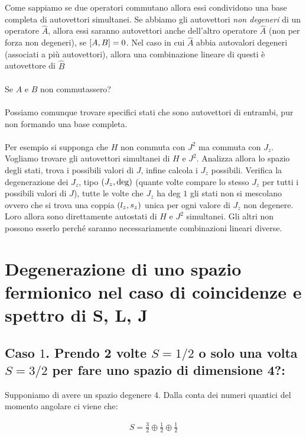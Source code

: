 	Come sappiamo se due operatori commutano allora essi condividono una base completa di autovettori simultanei. Se abbiamo gli autovettori \textit{non degeneri} di un operatore $\hat{A}$, allora essi saranno autovettori anche dell'altro operatore $\hat{A}$ (non per forza non degeneri), se $\qty[A, B] = 0$. Nel caso in cui $\hat{A}$ abbia autovalori degeneri (associati a più autovettori), allora una combinazione lineare di questi è autovettore di $\hat{B}$
	\\
	\\
	Se $A$ e $B$ non commutassero?
	\\
	\\
	Possiamo comunque trovare specifici stati che sono autovettori di entrambi, pur non formando una base completa.
	\\
	\\
	Per esempio si supponga che $H$ non commuta con $J^2$ ma commuta con $J_z$. Vogliamo trovare gli autovettori simultanei di $H$ e $J^2$. Analizza allora lo spazio degli stati, trova i possibili valori di $J$, infine calcola i $J_z$ possibili. Verifica la degenerazione dei $J_z$, tipo $\qty(J_z, \text{deg})$ (quante volte compare lo stesso $J_z$ per tutti i possibili valori di $J$), tutte le volte che $J_z$ ha deg $1$ gli stati non si mescolano ovvero che si trova una coppia $\qty(l_z, s_z)$ unica per ogni valore di $J_z$ non degenere. Loro allora sono direttamente autostati di $H$ e $J^2$ simultanei. Gli altri non possono esserlo perché saranno necessariamente combinazioni lineari diverse.




\section{Degenerazione di uno spazio fermionico nel caso di coincidenze e spettro di S, L, J}

\subsection{Caso $1$. Prendo 2 volte $S = 1/2$ o solo una volta $S = 3/2$ per fare uno spazio di dimensione 4?:}

	Supponiamo di avere un spazio degenere 4. Dalla conta dei numeri quantici del momento angolare ci viene che:
	
\begin{align*}
	S = \frac{3}{2} \oplus \frac{1}{2} \oplus \frac{1}{2}
\end{align*}

